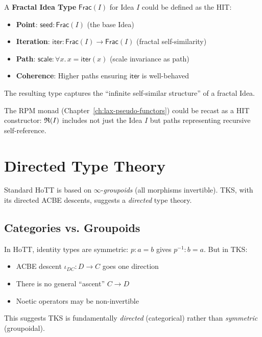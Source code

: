 \begin{definition}
\label{def:fractal-hit}
A \textbf{Fractal Idea Type} $\mathsf{Frac}(I)$ for Idea $I$ could be defined as the HIT:
\begin{itemize}
  \item \textbf{Point}: $\mathsf{seed} : \mathsf{Frac}(I)$ (the base Idea)
  \item \textbf{Iteration}: $\mathsf{iter} : \mathsf{Frac}(I) \to \mathsf{Frac}(I)$
        (fractal self-similarity)
  \item \textbf{Path}: $\mathsf{scale} : \forall x.\, x = \mathsf{iter}(x)$
        (scale invariance as path)
  \item \textbf{Coherence}: Higher paths ensuring $\mathsf{iter}$ is well-behaved
\end{itemize}
The resulting type captures the ``infinite self-similar structure'' of a fractal Idea.
\end{definition}

\begin{remark}
\label{rem:hits-rpm}
The RPM monad (Chapter~\ref{ch:lax-pseudo-functors}) could be recast as a HIT
constructor: $\mathfrak{R}(I)$ includes not just the Idea $I$ but paths representing
recursive self-reference.
\end{remark}

\section{Directed Type Theory}
\label{sec:directed-type-theory}

Standard HoTT is based on $\infty$-\emph{groupoids} (all morphisms invertible).
TKS, with its directed ACBE descents, suggests a \emph{directed} type theory.

\subsection{Categories vs. Groupoids}
\label{subsec:cat-vs-groupoid}

\begin{remark}
\label{rem:directedness-problem}
In HoTT, identity types are symmetric: $p : a = b$ gives $p^{-1} : b = a$.
But in TKS:
\begin{itemize}
  \item ACBE descent $\iota_{DC} : D \to C$ goes one direction
  \item There is no general ``ascent'' $C \to D$
  \item Noetic operators may be non-invertible
\end{itemize}
This suggests TKS is fundamentally \emph{directed} (categorical) rather than
\emph{symmetric} (groupoidal).
\end{remark}

